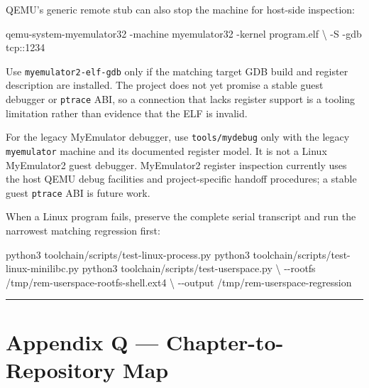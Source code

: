 \documentclass[
  oneside,
  openany]{book}
\newenvironment{Shaded}{\begin{snugshade}}{\end{snugshade}}
\newcommand{\AttributeTok}[1]{\textcolor[rgb]{0.13,0.29,0.53}{#1}}
\newcommand{\DataTypeTok}[1]{\textcolor[rgb]{0.13,0.29,0.53}{#1}}
\newcommand{\ExtensionTok}[1]{#1}
\newcommand{\NormalTok}[1]{#1}
\begin{document}
QEMU's generic remote stub can also stop the machine for host-side
inspection:

\begin{Shaded}
\begin{Highlighting}[]
\ExtensionTok{qemu{-}system{-}myemulator32} \AttributeTok{{-}machine}\NormalTok{ myemulator32 }\AttributeTok{{-}kernel}\NormalTok{ program.elf }\DataTypeTok{\textbackslash{}}
  \AttributeTok{{-}S} \AttributeTok{{-}gdb}\NormalTok{ tcp::1234}
\end{Highlighting}
\end{Shaded}

Use \texttt{myemulator2-elf-gdb} only if the matching target GDB build
and register description are installed. The project does not yet promise
a stable guest debugger or \texttt{ptrace} ABI, so a connection that
lacks register support is a tooling limitation rather than evidence that
the ELF is invalid.

For the legacy MyEmulator debugger, use \texttt{tools/mydebug} only with
the legacy \texttt{myemulator} machine and its documented register
model. It is not a Linux MyEmulator2 guest debugger. MyEmulator2
register inspection currently uses the host QEMU debug facilities and
project-specific handoff procedures; a stable guest \texttt{ptrace} ABI
is future work.

When a Linux program fails, preserve the complete serial transcript and
run the narrowest matching regression first:

\begin{Shaded}
\begin{Highlighting}[]
\ExtensionTok{python3}\NormalTok{ toolchain/scripts/test{-}linux{-}process.py}
\ExtensionTok{python3}\NormalTok{ toolchain/scripts/test{-}linux{-}minilibc.py}
\ExtensionTok{python3}\NormalTok{ toolchain/scripts/test{-}userspace.py }\DataTypeTok{\textbackslash{}}
  \AttributeTok{{-}{-}rootfs}\NormalTok{ /tmp/rem{-}userspace{-}rootfs{-}shell.ext4 }\DataTypeTok{\textbackslash{}}
  \AttributeTok{{-}{-}output}\NormalTok{ /tmp/rem{-}userspace{-}regression}
\end{Highlighting}
\end{Shaded}

\begin{center}\rule{0.5\linewidth}{0.5pt}\end{center}

\hypertarget{appendix-q-chapter-to-repository-map}{%
\chapter{Appendix Q --- Chapter-to-Repository
Map}\label{appendix-q-chapter-to-repository-map}}
\end{document}
